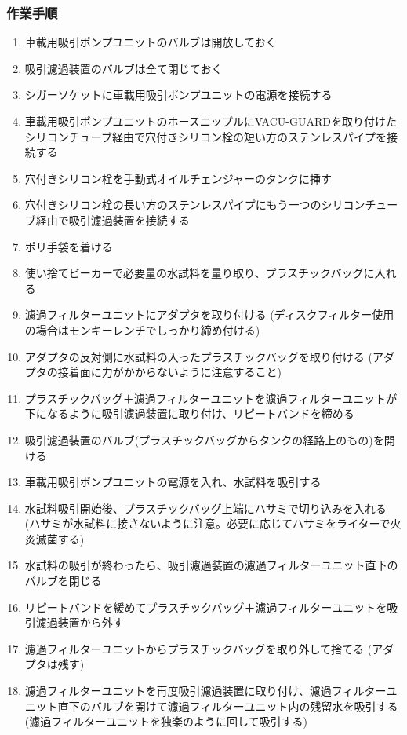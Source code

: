 \documentclass[titlepage,10pt,a4paper]{jsbook}
\begin{document}
\subsubsection{作業手順}
\begin{enumerate}
\item 車載用吸引ポンプユニットのバルブは開放しておく
\item 吸引濾過装置のバルブは全て閉じておく
\item シガーソケットに車載用吸引ポンプユニットの電源を接続する
\item 車載用吸引ポンプユニットのホースニップルにVACU-GUARDを取り付けたシリコンチューブ経由で穴付きシリコン栓の短い方のステンレスパイプを接続する
\item 穴付きシリコン栓を手動式オイルチェンジャーのタンクに挿す
\item 穴付きシリコン栓の長い方のステンレスパイプにもう一つのシリコンチューブ経由で吸引濾過装置を接続する
\item ポリ手袋を着ける
\item 使い捨てビーカーで必要量の水試料を量り取り、プラスチックバッグに入れる
\item 濾過フィルターユニットにアダプタを取り付ける (ディスクフィルター使用の場合はモンキーレンチでしっかり締め付ける)
\item アダプタの反対側に水試料の入ったプラスチックバッグを取り付ける (アダプタの接着面に力がかからないように注意すること)
\item プラスチックバッグ＋濾過フィルターユニットを濾過フィルターユニットが下になるように吸引濾過装置に取り付け、リピートバンドを締める
\item 吸引濾過装置のバルブ(プラスチックバッグからタンクの経路上のもの)を開ける
\item 車載用吸引ポンプユニットの電源を入れ、水試料を吸引する
\item 水試料吸引開始後、プラスチックバッグ上端にハサミで切り込みを入れる (ハサミが水試料に接さないように注意。必要に応じてハサミをライターで火炎滅菌する)
\item 水試料の吸引が終わったら、吸引濾過装置の濾過フィルターユニット直下のバルブを閉じる
\item リピートバンドを緩めてプラスチックバッグ＋濾過フィルターユニットを吸引濾過装置から外す
\item 濾過フィルターユニットからプラスチックバッグを取り外して捨てる (アダプタは残す)
\item 濾過フィルターユニットを再度吸引濾過装置に取り付け、濾過フィルターユニット直下のバルブを開けて濾過フィルターユニット内の残留水を吸引する (濾過フィルターユニットを独楽のように回して吸引する)

\end{enumerate}
\end{document}
